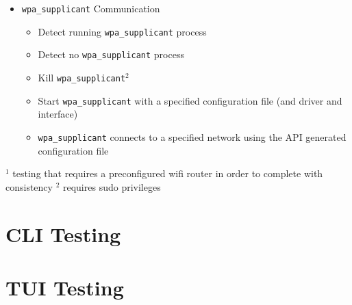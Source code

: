 \documentclass[11pt]{article}
\begin{document}
\begin{itemize}
  \item \texttt{wpa\_supplicant} Communication
  \begin{itemize}
    \item Detect running \texttt{wpa\_supplicant} process
    \item Detect no \texttt{wpa\_supplicant} process
    \item Kill \texttt{wpa\_supplicant}$^2$
    \item Start \texttt{wpa\_supplicant} with a specified configuration file (and driver and interface)
    \item \texttt{wpa\_supplicant} connects to a specified network using the API generated configuration file
  \end{itemize}

\end{itemize}

\small$^1$ testing that requires a preconfigured wifi router in order to complete with consistency
\small$^2$ requires sudo privileges

\section{CLI Testing}


\section{TUI Testing}
\end{document}

